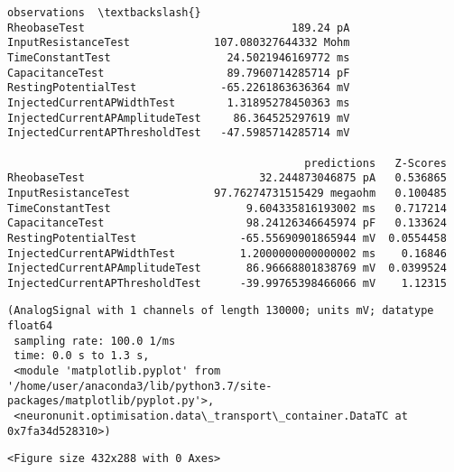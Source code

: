             \begin{tcolorbox}[breakable, size=fbox, boxrule=.5pt, pad at break*=1mm, opacityfill=0]
\begin{Verbatim}[commandchars=\\\{\}]
                                         observations  \textbackslash{}
RheobaseTest                                189.24 pA
InputResistanceTest             107.080327644332 Mohm
TimeConstantTest                  24.5021946169772 ms
CapacitanceTest                   89.7960714285714 pF
RestingPotentialTest             -65.2261863636364 mV
InjectedCurrentAPWidthTest        1.31895278450363 ms
InjectedCurrentAPAmplitudeTest     86.364525297619 mV
InjectedCurrentAPThresholdTest   -47.5985714285714 mV

                                              predictions   Z-Scores
RheobaseTest                           32.244873046875 pA   0.536865
InputResistanceTest             97.76274731515429 megaohm   0.100485
TimeConstantTest                     9.604335816193002 ms   0.717214
CapacitanceTest                      98.24126346645974 pF   0.133624
RestingPotentialTest                -65.55690901865944 mV  0.0554458
InjectedCurrentAPWidthTest          1.2000000000000002 ms    0.16846
InjectedCurrentAPAmplitudeTest       86.96668801838769 mV  0.0399524
InjectedCurrentAPThresholdTest      -39.99765398466066 mV    1.12315
\end{Verbatim}
\end{tcolorbox}
        
            \begin{tcolorbox}[breakable, size=fbox, boxrule=.5pt, pad at break*=1mm, opacityfill=0]
\begin{Verbatim}[commandchars=\\\{\}]
(AnalogSignal with 1 channels of length 130000; units mV; datatype float64
 sampling rate: 100.0 1/ms
 time: 0.0 s to 1.3 s,
 <module 'matplotlib.pyplot' from '/home/user/anaconda3/lib/python3.7/site-
packages/matplotlib/pyplot.py'>,
 <neuronunit.optimisation.data\_transport\_container.DataTC at 0x7fa34d528310>)
\end{Verbatim}
\end{tcolorbox}
        
    
    \begin{verbatim}
<Figure size 432x288 with 0 Axes>
    \end{verbatim}

    
    \begin{center}
    \end{center}
    { \hspace*{\fill} \\}
    
